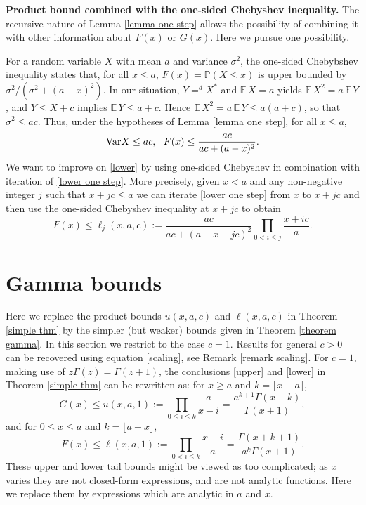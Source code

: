\documentclass[smallextended,envcountsect]{svjour3}
\begin{document}
\begin{remark}  \label{rem ell j} {\bf Product bound combined with the one-sided Chebyshev inequality.}
The recursive nature of Lemma \ref{lemma one step} allows the possibility of combining it with other information about $F(x)$ or $G(x)$.  Here we pursue 
one possibility.

 For a random variable $X$ with mean $a$ and variance $\sigma^2$,  the one-sided Chebybshev inequality states that, for all $x \le a$,
$F(x) = {\mathbb{P}}(X \le x)$ 
is upper bounded by $\sigma^2/(\sigma^2+(a-x)^2)$.
In our situation, $Y =^d X^*$ and ${\mathbb{E \,}} X=a$ yields ${\mathbb{E \,}} X^2 = a \, {\mathbb{E \,}} Y$, and   $Y \le X+c$  implies ${\mathbb{E \,}} Y \le a+c$. Hence
${\mathbb{E \,}} X^2 = a \, {\mathbb{E \,}} Y \le a(a+c)$, so that $\sigma^2 \le ac$.    Thus, under the hypotheses of Lemma \ref{lemma one step}, for all $x \le a$,
\begin{equation}\label{one sided}
   {{\rm Var}} X \le ac,  \ \    F(x) \le \frac{ac}{ac+(a-x)^2}.
\end{equation}
We want to improve on \eqref{lower} by using one-sided
Chebyshev in combination with iteration of \eqref{lower one step}.  More precisely, given $x < a$ and any non-negative integer $j$ such that $x+jc \le a$ we can iterate \eqref{lower one step} from $x$ to $x+jc$ and then use the one-sided Chebyshev inequality at $x+jc$ to obtain
    \begin{equation} \label{lower j}
    F(x) \le \ell_j(x,a,c):=\frac{ac}{ac+(a-x-jc)^2} \prod_{0 < i \le j}\frac{x+ic}{a}.
     \end{equation}

 \end{remark}

\section{Gamma bounds}  \label{sect gamma}

Here we replace the product bounds $u(x,a,c)$ and $\ell(x,a,c)$ in Theorem \ref{simple thm} by the simpler (but weaker) bounds given in Theorem \ref{theorem gamma}.  In this section we restrict to the case $c = 1$.  Results for general $c > 0$ can be recovered using equation \eqref{scaling}, see Remark \ref{remark scaling}.  For $c=1$, making use of $z\Gamma(z) = \Gamma(z+1)$, the conclusions \eqref{upper} and \eqref{lower} in Theorem \ref{simple thm} can be rewritten as: for $x \ge a$ and $k=\lfloor x-a \rfloor$,
\begin{equation}\label{upper c 1}
    G(x) \le u(x,a,1) := \prod_{0 \le i \le k} \frac{a}{x-i} =  \frac{a^{k+1} \Gamma(x-k)}{\Gamma(x+1)},
\end{equation}
and for $0 \le x \le a$ and $k=\lfloor a-x \rfloor$,
\begin{equation}\label{lower c 1}
F(x) \le \ell(x,a,1) := \prod_{0 < i \le k} \frac{x+i}{a} =  \frac{\Gamma(x+k+1)}{a^k\Gamma(x+1)}.
\end{equation}
These upper and lower tail bounds might be viewed as too complicated;  as $x$ varies
they are not closed-form expressions, and are not analytic functions.  Here we replace them by expressions which are analytic in $a$ and $x$.
\end{document}
